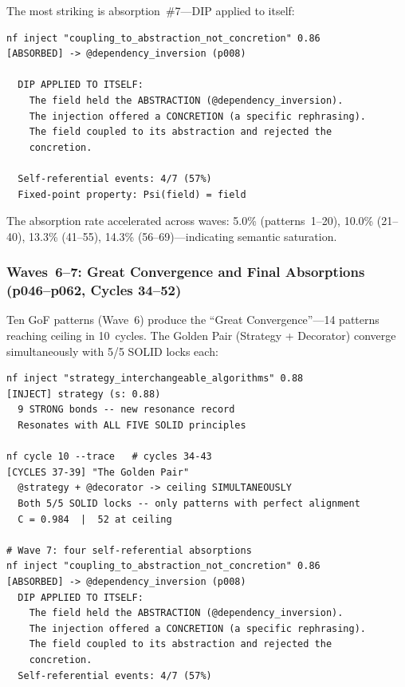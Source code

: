 \noindent
The most striking is absorption~\#7---DIP applied to itself:

\begin{terminalbox}
\begin{lstlisting}[style=neosshell]
nf inject "coupling_to_abstraction_not_concretion" 0.86
[ABSORBED] -> @dependency_inversion (p008)

  DIP APPLIED TO ITSELF:
    The field held the ABSTRACTION (@dependency_inversion).
    The injection offered a CONCRETION (a specific rephrasing).
    The field coupled to its abstraction and rejected the
    concretion.

  Self-referential events: 4/7 (57%)
  Fixed-point property: Psi(field) = field
\end{lstlisting}
\end{terminalbox}

\noindent
The absorption rate accelerated across waves: 5.0\%
(patterns~1--20), 10.0\% (21--40), 13.3\% (41--55), 14.3\%
(56--69)---indicating semantic saturation.

\subsubsection*{Waves~6--7: Great Convergence and Final Absorptions
  (p046--p062, Cycles 34--52)}

Ten GoF patterns (Wave~6) produce the ``Great Convergence''---14
patterns reaching ceiling in 10~cycles.  The Golden Pair (Strategy +
Decorator) converge simultaneously with 5/5 SOLID locks each:

\begin{terminalbox}
\begin{lstlisting}[style=neosshell]
nf inject "strategy_interchangeable_algorithms" 0.88
[INJECT] strategy (s: 0.88)
  9 STRONG bonds -- new resonance record
  Resonates with ALL FIVE SOLID principles

nf cycle 10 --trace   # cycles 34-43
[CYCLES 37-39] "The Golden Pair"
  @strategy + @decorator -> ceiling SIMULTANEOUSLY
  Both 5/5 SOLID locks -- only patterns with perfect alignment
  C = 0.984  |  52 at ceiling

# Wave 7: four self-referential absorptions
nf inject "coupling_to_abstraction_not_concretion" 0.86
[ABSORBED] -> @dependency_inversion (p008)
  DIP APPLIED TO ITSELF:
    The field held the ABSTRACTION (@dependency_inversion).
    The injection offered a CONCRETION (a specific rephrasing).
    The field coupled to its abstraction and rejected the
    concretion.
  Self-referential events: 4/7 (57%)
\end{lstlisting}
\end{terminalbox}

